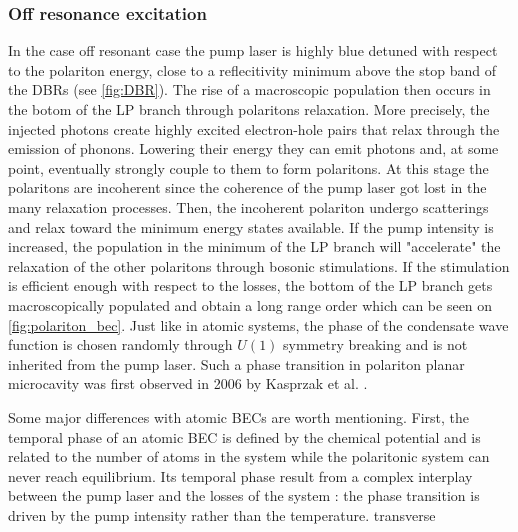 \bigskip

\subsubsection{Off resonance excitation} In the case off resonant case the pump laser is highly blue detuned with respect to the polariton energy, close to a reflecitivity minimum above the stop band of the DBRs (see \autoref{fig:DBR}).
The rise of a macroscopic population then occurs in the botom of the LP branch through polaritons relaxation. More precisely, the injected photons create highly excited electron-hole pairs that relax through the emission of phonons. 
Lowering their energy they can emit photons and, at some point, eventually strongly couple to them to form polaritons. At this stage the polaritons are incoherent since the coherence of the pump laser got lost in the many relaxation processes.
Then, the incoherent polariton undergo scatterings and relax toward the minimum energy states available. If the pump intensity is increased, the population in the minimum of the LP branch will "accelerate" the relaxation of the other polaritons through bosonic stimulations.
If the stimulation is efficient enough with respect to the losses, the bottom of the LP branch gets macroscopically populated and obtain a long range order which can be seen on \autoref{fig:polariton_bec}. Just like in atomic systems, the phase of the condensate wave function is chosen randomly through $U(1)$ symmetry breaking and is not inherited from the pump laser.
Such a phase transition in polariton planar microcavity was first observed in 2006 by Kasprzak et al. \cite{kasprzak_boseeinstein_2006}. 


Some major differences with atomic BECs are worth mentioning. First, the temporal phase of an atomic BEC is defined by the chemical potential and is related to the number of atoms in the system while 
the polaritonic system can never reach equilibrium. Its temporal phase result from a complex interplay between the pump laser and the losses of the system : the phase transition is driven by the pump intensity rather than the temperature.
transverse

